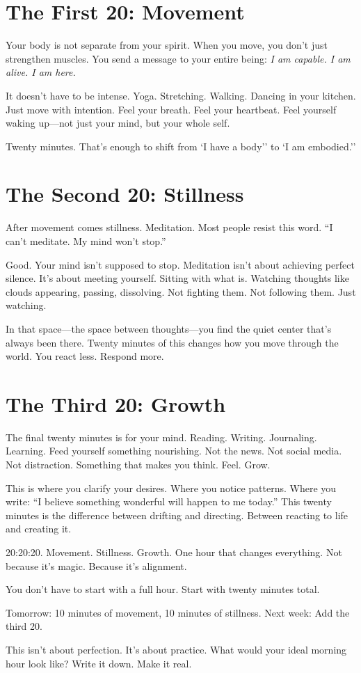 \documentclass[11pt, a5paper, openright]{book}
\begin{document}
\section*{The First 20: Movement}
Your body is not separate from your spirit. When you move, you don't just strengthen muscles. You send a message to your entire being: \textit{I am capable. I am alive. I am here.}

It doesn't have to be intense. Yoga. Stretching. Walking. Dancing in your kitchen. Just move with intention. Feel your breath. Feel your heartbeat. Feel yourself waking up—not just your mind, but your whole self.

Twenty minutes. That's enough to shift from `I have a body'' to `I am embodied.''

\section*{The Second 20: Stillness}
After movement comes stillness. Meditation. Most people resist this word. ``I can't meditate. My mind won't stop.''

Good. Your mind isn't supposed to stop. Meditation isn't about achieving perfect silence. It's about meeting yourself. Sitting with what is. Watching thoughts like clouds appearing, passing, dissolving. Not fighting them. Not following them. Just watching.

In that space—the space between thoughts—you find the quiet center that's always been there. Twenty minutes of this changes how you move through the world. You react less. Respond more.

\section*{The Third 20: Growth}
The final twenty minutes is for your mind. Reading. Writing. Journaling. Learning. Feed yourself something nourishing. Not the news. Not social media. Not distraction. Something that makes you think. Feel. Grow.

This is where you clarify your desires. Where you notice patterns. Where you write: ``I believe something wonderful will happen to me today.'' This twenty minutes is the difference between drifting and directing. Between reacting to life and creating it.

20:20:20. Movement. Stillness. Growth. One hour that changes everything. Not because it's magic. Because it's alignment.

\begin{reflectionbox}
You don't have to start with a full hour. Start with twenty minutes total.

Tomorrow: 10 minutes of movement, 10 minutes of stillness.
Next week: Add the third 20.

This isn't about perfection. It's about practice. What would your ideal morning hour look like? Write it down. Make it real.
\end{reflectionbox}
\end{document}
